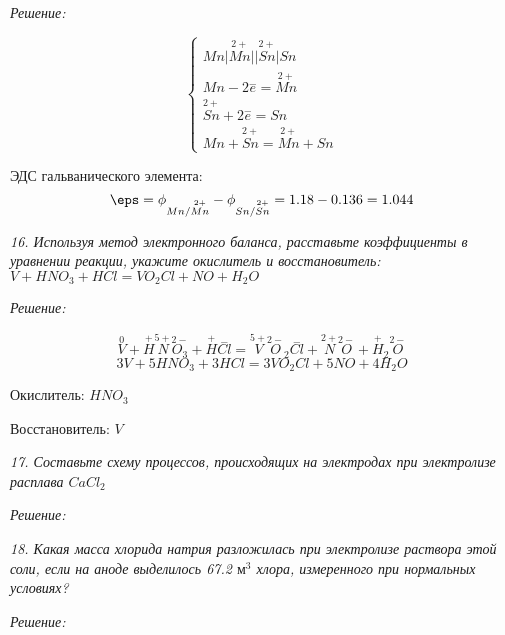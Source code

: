 \emph{Решение:}

\[
	\left\{ \begin{array}{ll}
		Mn \vert \stackrel{2+}{Mn} \vert\vert \stackrel{2+}{Sn} \vert Sn \\
		Mn - 2\stackrel{-}{e} = \stackrel{2+}{Mn} \\
		\stackrel{2+}{Sn} + 2\stackrel{-}{e} = Sn \\
		Mn + \stackrel{2+}{Sn} = \stackrel{2+}{Mn} + Sn 
	\end{array} \right.
\]

ЭДС гальванического элемента:
\[
	\eps = \phi_{Mn/\stackrel{2+}{Mn}} - \phi_{Sn/\stackrel{2+}{Sn}} = 
	1.18 - 0.136 = 1.044
\]

\pagebreak

\emph{16. Используя метод электронного баланса, расставьте коэффициенты 
в уравнении реакции, укажите окислитель и восстановитель:
\( V + HNO_3 + HCl = VO_2 Cl + NO + H_2 O \) }

\emph{Решение:}

\[ 
	\stackrel{0}{V} + \stackrel{+}{H}\stackrel{5+}{N}\stackrel{2-}{O_3} + 
	\stackrel{+}{H}\stackrel{-}{Cl} = \stackrel{5+}{V}\stackrel{2-}{O}_2
	\stackrel{-}{Cl} + \stackrel{2+}{N}\stackrel{2-}{O} + 
	\stackrel{+}{H}_2\stackrel{2-}{O} 
\]
\[ 3V + 5HNO_3 + 3HCl = 3VO_2 Cl + 5NO + 4H_2 O \]

Окислитель: \( HNO_3 \)

Восстановитель: \( V \) \\ 

\pagebreak

\emph{17. Составьте схему процессов, происходящих на электродах при 
электролизе расплава \( CaCl_2 \)}

\emph{Решение:}

\pagebreak

\emph{18. Какая масса хлорида натрия разложилась при электролизе раствора 
этой соли, если на аноде выделилось 67.2 \( \text{м}^3 \) хлора, 
измеренного при нормальных условиях?}

\emph{Решение:}


